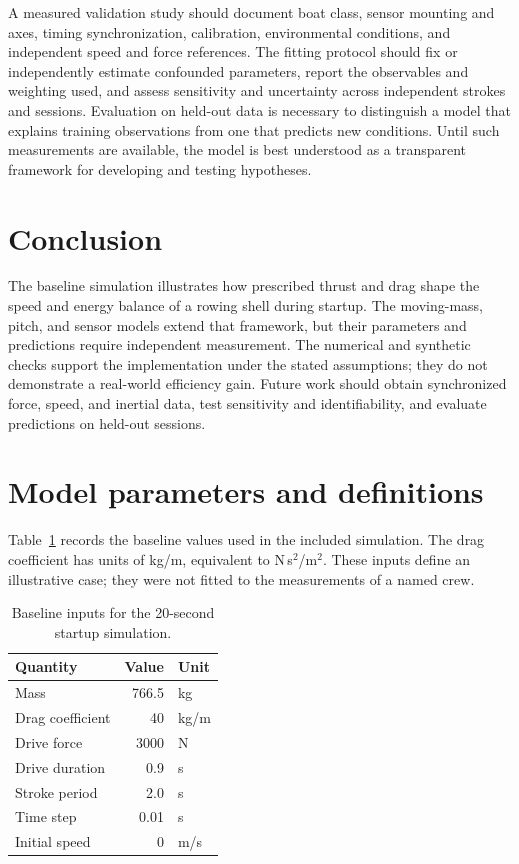 \documentclass[11pt]{article}
\begin{document}
A measured validation study should document boat class, sensor mounting and axes, timing synchronization, calibration, environmental conditions, and independent speed and force references. The fitting protocol should fix or independently estimate confounded parameters, report the observables and weighting used, and assess sensitivity and uncertainty across independent strokes and sessions. Evaluation on held-out data is necessary to distinguish a model that explains training observations from one that predicts new conditions. Until such measurements are available, the model is best understood as a transparent framework for developing and testing hypotheses.

\section{Conclusion}
The baseline simulation illustrates how prescribed thrust and drag shape the speed and energy balance of a rowing shell during startup. The moving-mass, pitch, and sensor models extend that framework, but their parameters and predictions require independent measurement. The numerical and synthetic checks support the implementation under the stated assumptions; they do not demonstrate a real-world efficiency gain. Future work should obtain synchronized force, speed, and inertial data, test sensitivity and identifiability, and evaluate predictions on held-out sessions.

\appendix
\section{Model parameters and definitions}
Table~\ref{tab:baseline} records the baseline values used in the included simulation. The drag coefficient has units of kg/m, equivalent to N\,s$^2$/m$^2$. These inputs define an illustrative case; they were not fitted to the measurements of a named crew.
\begin{table}[ht]\centering\caption{Baseline inputs for the 20-second startup simulation.}\label{tab:baseline}
\begin{tabular}{lrl}\toprule Quantity & Value & Unit \\\midrule
Mass & 766.5 & kg \\
Drag coefficient & 40 & kg/m \\
Drive force & 3000 & N \\
Drive duration & 0.9 & s \\
Stroke period & 2.0 & s \\
Time step & 0.01 & s \\
Initial speed & 0 & m/s \\\bottomrule\end{tabular}\end{table}
\end{document}

